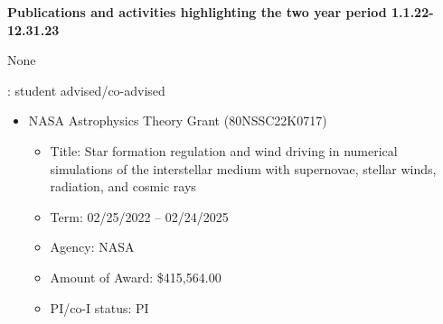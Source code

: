 \documentclass[12pt]{article}
\begin{document}
\begin{center}
{\large \bf Publications and activities highlighting the two year period 1.1.22-12.31.23}
\end{center}


None


: student advised/co-advised

\begin{itemize}[itemsep=0pt,topsep=\parskip]
    \small 
\end{itemize}


\begin{itemize}[itemsep=0pt,topsep=\parskip]
    \small 
\end{itemize}


\begin{itemize}
    \item NASA Astrophysics Theory Grant (80NSSC22K0717)
    \begin{itemize}
        \item Title: Star formation regulation and wind driving in numerical simulations of the interstellar medium with supernovae, stellar winds, radiation, and cosmic rays
        \item Term: 02/25/2022 -- 02/24/2025
        \item Agency: NASA
        \item Amount of Award: \$415,564.00
        \item PI/co-I status: PI
    \end{itemize}
\end{itemize}

\end{document}
